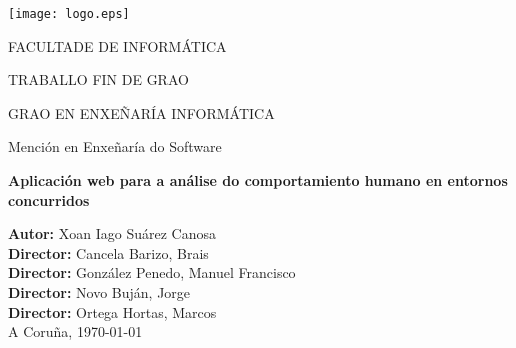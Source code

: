\begin{titlepage}
\begin{center}

\texttt{[image: logo.eps]}

\vspace{0.5cm}
FACULTADE DE INFORMÁTICA

\vspace*{1cm}

\Large{TRABALLO FIN DE GRAO}

\Large{GRAO EN ENXEÑARÍA INFORMÁTICA}

Mención en Enxeñaría do Software

\vspace*{2cm}

\textbf{\LARGE{Aplicación web para a análise do comportamiento humano en entornos concurridos}}

\end{center}

\vspace*{4cm}

\begin{flushright}
\large{
\textbf{Autor:} Xoan Iago Suárez Canosa\\
\textbf{Director:} Cancela Barizo, Brais \\
\textbf{Director:} González Penedo, Manuel Francisco \\
\textbf{Director:} Novo Buján, Jorge \\
\textbf{Director:} Ortega Hortas, Marcos \\
\vspace{0.5cm}
A Coruña, \today}
\end{flushright}

\end{titlepage}
